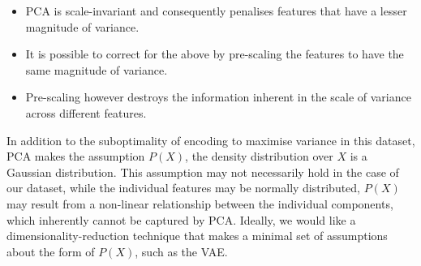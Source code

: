 \begin{itemize}
    \item PCA is scale-invariant and consequently penalises features that have a lesser magnitude of variance.
    \item It is possible to correct for the above by pre-scaling the features to have the same magnitude of variance.
    \item Pre-scaling however destroys the information inherent in the scale of variance across different features.
\end{itemize}

In addition to the suboptimality of encoding to maximise variance in this dataset, PCA makes the assumption $P(X)$, the density distribution over $X$ is a Gaussian distribution. This assumption may not necessarily hold in the case of our dataset, while the individual features may be normally distributed, $P(X)$ may result from a non-linear relationship between the individual components, which inherently cannot be captured by PCA. Ideally, we would like a dimensionality-reduction technique that makes a minimal set of assumptions about the form of $P(X)$, such as the VAE.


